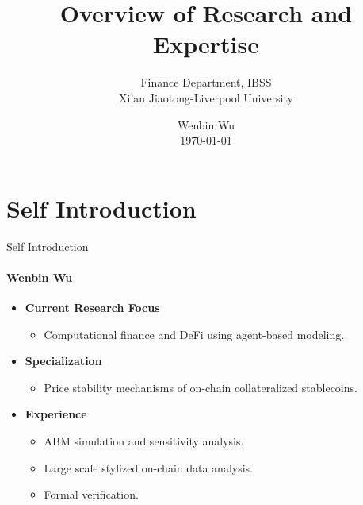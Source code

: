 \documentclass{beamer}
\title{Overview of Research and Expertise}
\subtitle{Finance Department, IBSS \\ 
Xi’an Jiaotong-Liverpool University\\\vspace{2cm}}
\author{Wenbin Wu\\ \today}
\begin{document}
\shorthandoff{-}
\frame[c]{\maketitle}


\section{Self Introduction}

\begin{frame}{Self Introduction}
\framesubtitle{Wenbin Wu}
    \begin{itemize}
        \item \textbf{Current Research Focus}
        \begin{itemize}
            \item Computational finance and DeFi using agent-based modeling.
        \end{itemize}

        \item \textbf{Specialization}
        \begin{itemize}
            \item Price stability mechanisms of on-chain collateralized stablecoins.
        \end{itemize}

        \item \textbf{Experience}
        \begin{itemize}
            \item ABM simulation and sensitivity analysis. 
            \item Large scale stylized on-chain data analysis.
            \item Formal verification.
        \end{itemize}
    \end{itemize}
\end{frame}
\end{document}
